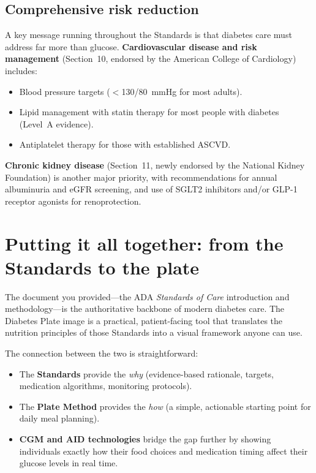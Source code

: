 \documentclass[11pt,a4paper]{article}
\begin{document}
\subsection{Comprehensive risk reduction}

A key message running throughout the Standards is that diabetes care must
address far more than glucose. \textbf{Cardiovascular disease and risk
management} (Section~10, endorsed by the American College of Cardiology)
includes:

\begin{itemize}
  \item Blood pressure targets ($<$130/80~mmHg for most adults).
  \item Lipid management with statin therapy for most people with diabetes
        (Level~A evidence).
  \item Antiplatelet therapy for those with established ASCVD.
\end{itemize}

\textbf{Chronic kidney disease} (Section~11, newly endorsed by the National
Kidney Foundation) is another major priority, with recommendations for annual
albuminuria and eGFR screening, and use of SGLT2 inhibitors and/or GLP-1
receptor agonists for renoprotection.

\section{Putting it all together: from the Standards to the plate}

The document you provided---the ADA \emph{Standards of Care} introduction and
methodology---is the authoritative backbone of modern diabetes care. The
Diabetes Plate image is a practical, patient-facing tool that translates the
nutrition principles of those Standards into a visual framework anyone can
use.

The connection between the two is straightforward:

\begin{itemize}
  \item The \textbf{Standards} provide the \emph{why} (evidence-based
        rationale, targets, medication algorithms, monitoring protocols).
  \item The \textbf{Plate Method} provides the \emph{how} (a simple,
        actionable starting point for daily meal planning).
  \item \textbf{CGM and AID technologies} bridge the gap further by showing
        individuals exactly how their food choices and medication timing
        affect their glucose levels in real time.
\end{itemize}
\end{document}
